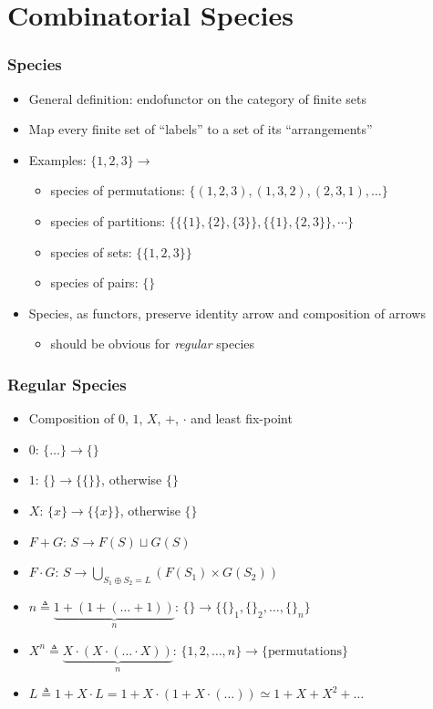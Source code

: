 \section{Combinatorial Species}

\begin{frame}
\frametitle{Species}

\begin{itemize}
\item General definition: endofunctor on the category of finite sets

\item Map every finite set of ``labels'' to a set of its ``arrangements''

\item Examples: $\{1, 2, 3\} \rightarrow$

\begin{itemize}
\item species of permutations:
$\big\{(1,2,3), (1,3,2), (2,3,1), \dots\big\}$
\item species of partitions:
$\Big\{\big\{\{1\},\{2\},\{3\}\big\}, \big\{\{1\}, \{2,3\}\big\}, \cdots \Big\}$
\item species of sets:
$\big\{\{1,2,3\}\big\}$
\item species of pairs:
$\{\}$
\end{itemize}

\item Species, as functors, preserve identity arrow and composition of arrows
\begin{itemize}
\item should be obvious for \textit{regular} species
\end{itemize}
\end{itemize}
\end{frame}

\begin{frame}
\frametitle{Regular Species}

\begin{itemize}
\item Composition of $0$, $1$, $X$, $+$, $\cdot$ and least fix-point
\item $0$: $\{\dots\} \rightarrow \{\}$
\item $1$: $\{\} \rightarrow \{\{\}\}$, otherwise $\{\}$
\item $X$: $\{x\} \rightarrow \{\{x\}\}$, otherwise $\{\}$
\item $F + G$: $S \rightarrow F(S) \sqcup G(S)$
\item $F \cdot G$: $S \rightarrow \bigcup\limits_{S_1 \oplus S_2=L}(F(S_1) \times G(S_2))$
\item $n \triangleq \underbrace{1 + (1 + (\ldots + 1))}_n$:
$\{\} \rightarrow \{\{\}_1, \{\}_2, \ldots, \{\}_n\}$
\item $X^n \triangleq \underbrace{X \cdot (X \cdot (\ldots \cdot X))}_n$:
$\{1, 2, \ldots, n\} \rightarrow \{\text{permutations}\}$
\item $L \triangleq 1 + X \cdot L = 1 + X \cdot (1 + X \cdot (\ldots)) \simeq 1 + X + X^2 + \ldots$
\end{itemize}
\end{frame}

